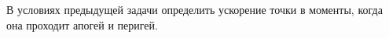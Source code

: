 В условиях предыдущей задачи определить ускорение точки в моменты, когда
она проходит апогей и перигей.
